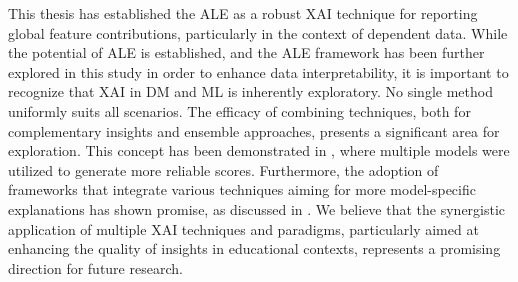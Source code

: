 This thesis has established the \gls{ALE} as a robust \gls{XAI} technique for reporting global feature contributions, particularly in the context of dependent data. While the potential of \gls{ALE} is established, and the \gls{ALE} framework has been further explored in this study in order to enhance data interpretability, it is important to recognize that \gls{XAI} in \gls{DM} and \gls{ML} is inherently exploratory. No single method uniformly suits all scenarios. The efficacy of combining techniques, both for complementary insights and ensemble approaches, presents a significant area for exploration. This concept has been demonstrated in \cite{Fisher2018AllSimultaneously}, where multiple models were utilized to generate more reliable scores. Furthermore, the adoption of frameworks that integrate various techniques aiming for more model-specific explanations has shown promise, as discussed in \cite{Li2019AForests}. We believe that the synergistic application of multiple \gls{XAI} techniques and paradigms, particularly aimed at enhancing the quality of insights in educational contexts, represents a promising direction for future research.




 




